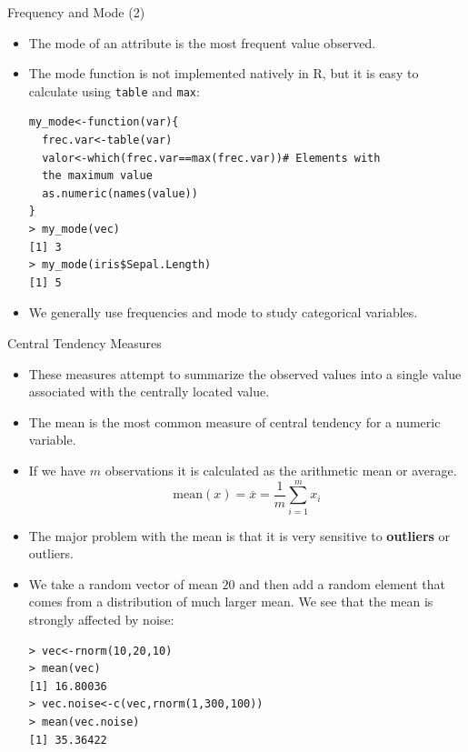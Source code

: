 \documentclass[handout]{beamer}
\begin{document}
\begin{frame}[fragile]{Frequency and Mode (2)}
\scriptsize{
\begin{itemize}
 \item The mode of an attribute is the most frequent value observed.
 \item The mode function is not implemented natively in R, but it is easy to calculate using \verb+table+ and \verb+max+:
 \begin{verbatim}
my_mode<-function(var){
  frec.var<-table(var)
  valor<-which(frec.var==max(frec.var))# Elements with 
  the maximum value
  as.numeric(names(value))
}
> my_mode(vec)
[1] 3
> my_mode(iris$Sepal.Length)
[1] 5
 \end{verbatim}
 
\item We generally use frequencies and mode to study categorical variables.

\end{itemize}
 

 }
\end{frame}


\begin{frame}[fragile]{Central Tendency Measures}
\scriptsize{
\begin{itemize}
 \item These measures attempt to summarize the observed values into a single value associated with the centrally located value.
 \item The mean is the most common measure of central tendency for a numeric variable.  
 \item If we have $m$ observations it is calculated as the arithmetic mean or average.
 \begin{displaymath}
   \text{mean}(x) = \overline{x} = \frac{1}{m} \sum_{i=1}^{m} x_i
 \end{displaymath}

 \item The major problem with the mean is that it is very sensitive to \textbf{outliers} or outliers.
 
 \item We take a random vector of mean $20$ and then add a random element that comes from a distribution of much larger mean.  We see that the mean is strongly affected by noise:
 \begin{verbatim}
> vec<-rnorm(10,20,10)
> mean(vec)
[1] 16.80036
> vec.noise<-c(vec,rnorm(1,300,100))
> mean(vec.noise)
[1] 35.36422
 \end{verbatim}

 
\end{itemize}

 
}
 
\end{frame}
\end{document}
